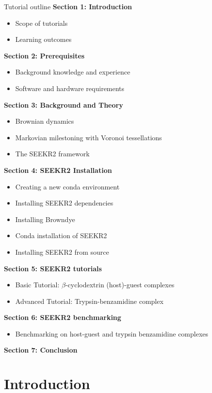 \documentclass[9pt,training,pubversion]{livecoms}
\begin{document}
\begin{checklist}{Tutorial outline}
\vspace{3mm}
\textbf{Section 1: Introduction}
\begin{itemize}
\item Scope of tutorials 
\item Learning outcomes
\end{itemize}
\textbf{Section 2: Prerequisites}
\begin{itemize}
\item Background knowledge and experience 
\item Software and hardware requirements
\end{itemize}
\textbf{Section 3: Background and Theory}
\begin{itemize}
\item Brownian dynamics 
\item Markovian milestoning with Voronoi tessellations
\item The SEEKR2 framework
\end{itemize}
\textbf{Section 4: SEEKR2 Installation}
\begin{itemize}
\item Creating a new conda environment
\item Installing SEEKR2 dependencies 
\item Installing Browndye
\item Conda installation of SEEKR2
\item Installing SEEKR2 from source
\end{itemize}
\textbf{Section 5: SEEKR2 tutorials}
\begin{itemize}
\item Basic Tutorial: $\beta$-cyclodextrin (host)-guest complexes
\item Advanced Tutorial: Trypsin-benzamidine complex
\end{itemize}
\textbf{Section 6: SEEKR2 benchmarking} 
\begin{itemize}
\item Benchmarking on host-guest and trypsin benzamidine complexes
\end{itemize}
\noindent \textbf{Section 7: Conclusion}
\vspace{3mm}
\end{checklist}

\vspace{2mm} 

\section{Introduction}
\vspace{2mm}
\end{document}
